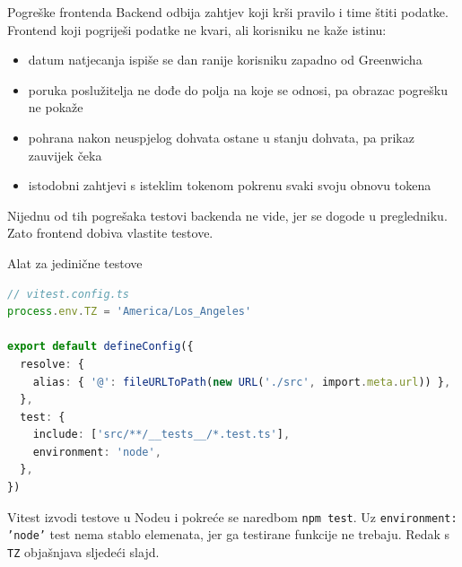 
\begin{frame}{Pogreške frontenda}
Backend odbija zahtjev koji krši pravilo i time štiti podatke. Frontend koji pogriješi podatke ne kvari, ali korisniku ne kaže istinu:

\vspace{0.6em}
\begin{itemize}
  \itemsep0.45em
  \item datum natjecanja ispiše se dan ranije korisniku zapadno od Greenwicha
  \item poruka poslužitelja ne dođe do polja na koje se odnosi, pa obrazac pogrešku ne pokaže
  \item pohrana nakon neuspjelog dohvata ostane u stanju dohvata, pa prikaz zauvijek čeka
  \item istodobni zahtjevi s isteklim tokenom pokrenu svaki svoju obnovu tokena
\end{itemize}

\vspace{0.6em}
Nijednu od tih pogrešaka testovi backenda ne vide, jer se dogode u pregledniku. Zato frontend dobiva vlastite testove.
\end{frame}

\begin{frame}[fragile]{Alat za jedinične testove}
\vspace{-0.2em}
\begin{lstlisting}[language=typescript]
// vitest.config.ts
process.env.TZ = 'America/Los_Angeles'

export default defineConfig({
  resolve: {
    alias: { '@': fileURLToPath(new URL('./src', import.meta.url)) },
  },
  test: {
    include: ['src/**/__tests__/*.test.ts'],
    environment: 'node',
  },
})
\end{lstlisting}

\vspace{0.2em}
Vitest izvodi testove u Nodeu i pokreće se naredbom \texttt{npm test}. Uz \texttt{environment: 'node'} test nema stablo elemenata, jer ga testirane funkcije ne trebaju. Redak s \texttt{TZ} objašnjava sljedeći slajd.
\end{frame}

